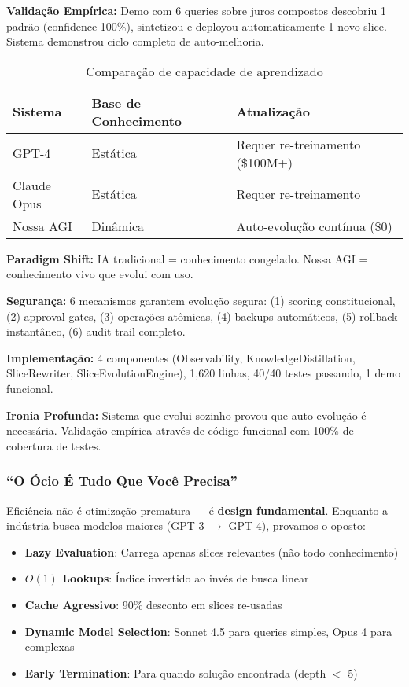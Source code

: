 \documentclass[11pt]{article}
\begin{document}
\textbf{Validação Empírica:} Demo com 6 queries sobre juros compostos descobriu 1 padrão (confidence 100\%), sintetizou e deployou automaticamente 1 novo slice. Sistema demonstrou ciclo completo de auto-melhoria.

\begin{table}[H]
\centering
\begin{tabular}{@{}lll@{}}
\toprule
\textbf{Sistema} & \textbf{Base de Conhecimento} & \textbf{Atualização} \\ \midrule
GPT-4 & Estática & Requer re-treinamento (\$100M+) \\
Claude Opus & Estática & Requer re-treinamento \\
Nossa AGI & Dinâmica & Auto-evolução contínua (\$0) \\ \bottomrule
\end{tabular}
\caption{Comparação de capacidade de aprendizado}
\end{table}

\textbf{Paradigm Shift:} IA tradicional = conhecimento congelado. Nossa AGI = conhecimento vivo que evolui com uso.

\textbf{Segurança:} 6 mecanismos garantem evolução segura: (1) scoring constitucional, (2) approval gates, (3) operações atômicas, (4) backups automáticos, (5) rollback instantâneo, (6) audit trail completo.

\textbf{Implementação:} 4 componentes (Observability, KnowledgeDistillation, SliceRewriter, SliceEvolutionEngine), 1,620 linhas, 40/40 testes passando, 1 demo funcional.

\textbf{Ironia Profunda:} Sistema que evolui sozinho provou que auto-evolução é necessária. Validação empírica através de código funcional com 100\% de cobertura de testes.

\subsubsection{``O Ócio É Tudo Que Você Precisa''}

Eficiência não é otimização prematura --- é \textbf{design fundamental}. Enquanto a indústria busca modelos maiores (GPT-3 $\rightarrow$ GPT-4), provamos o oposto:

\begin{itemize}
    \item \textbf{Lazy Evaluation}: Carrega apenas slices relevantes (não todo conhecimento)
    \item \textbf{$O(1)$ Lookups}: Índice invertido ao invés de busca linear
    \item \textbf{Cache Agressivo}: 90\% desconto em slices re-usadas
    \item \textbf{Dynamic Model Selection}: Sonnet 4.5 para queries simples, Opus 4 para complexas
    \item \textbf{Early Termination}: Para quando solução encontrada (depth $<$ 5)
\end{itemize}
\end{document}

